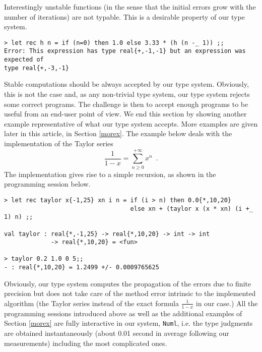 Interestingly unstable functions (in the sense that the initial errors grow with 
the number of iterations) are not typable. This is a desirable property of our type system.
\begin{verbatim}
> let rec h n = if (n=0) then 1.0 else 3.33 * (h (n -_ 1)) ;;
Error: This expression has type real{+,-1,-1} but an expression was expected of 
type real{+,-3,-1}
\end{verbatim}

Stable computations should be always accepted by our type system. Obviously,
this is not the case and, as any non-trivial type system, our type system rejects some correct programs.
The challenge is then to accept enough programs to be useful from an end-user point of view.
We end this section by showing another example representative of what our type
system accepts. More examples are given later in this article, in Section \ref{morex}.
The example below deals with the implementation of the Taylor series
\begin{equation}
\frac{1}{1-x}=\sum_{n\ge 0}^{+\infty} x^n\enspace .
\end{equation}
The implementation  gives rise to a simple recursion, as shown in the programming
session below.

\begin{verbatim}
> let rec taylor x{-1,25} xn i n = if (i > n) then 0.0{*,10,20}
                                   else xn + (taylor x (x * xn) (i +_ 1) n) ;;

val taylor : real{*,-1,25} -> real{*,10,20} -> int -> int 
             -> real{*,10,20} = <fun>

> taylor 0.2 1.0 0 5;;
- : real{*,10,20} = 1.2499 +/- 0.0009765625
\end{verbatim}



Obviously, our type system computes the propagation of the errors due to finite precision
but does not take care of the method error intrinsic to the implemented algorithm (the Taylor series instead of the exact formula $\frac{1}{1-x}$
in our case.)
All the programming sessions introduced above as well as the additional examples of Section \ref{morex} are fully interactive in our system, \texttt{Numl},
i.e. the type judgments are obtained instantaneously (about 0.01 second in average following our measurements)
including the most complicated ones.

